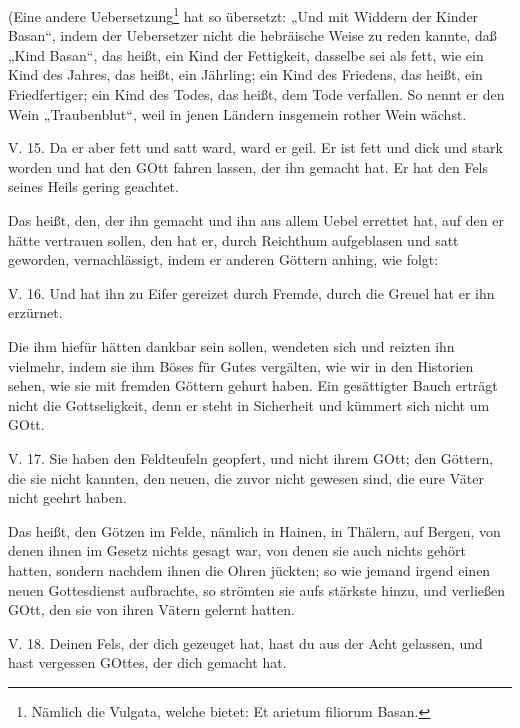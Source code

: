 (Eine andere Uebersetzung\footnote{Nämlich die Vulgata, welche bietet: Et arietum filiorum Basan.} hat so übersetzt: „Und mit Widdern der Kinder Basan“, indem der Uebersetzer nicht die hebräische Weise zu reden kannte, daß „Kind Basan“, das heißt, ein Kind der Fettigkeit, dasselbe sei als fett, wie ein Kind des Jahres, das heißt, ein Jährling; ein Kind des Friedens, das heißt, ein Friedfertiger; ein Kind des Todes, das heißt, dem Tode verfallen. So nennt er den Wein „Traubenblut“, weil in jenen Ländern insgemein rother Wein wächst.

\begin{schriftzitat}
V. 15. Da er aber fett und satt ward, ward er geil. Er ist fett und dick und stark worden und hat den GOtt fahren lassen, der ihn gemacht hat. Er hat den Fels seines Heils gering geachtet.
\end{schriftzitat}

Das heißt, den, der ihn gemacht und ihn aus allem Uebel errettet hat, auf den er hätte vertrauen sollen, den hat er, durch Reichthum aufgeblasen und satt geworden, vernachlässigt, indem er anderen Göttern anhing, wie folgt:

\begin{schriftzitat}
V. 16. Und hat ihn zu Eifer gereizet durch Fremde, durch die Greuel hat er ihn erzürnet.
\end{schriftzitat}

Die ihm hiefür hätten dankbar sein sollen, wendeten sich und reizten ihn vielmehr, indem
sie ihm Böses für Gutes vergälten, wie wir in den Historien sehen, wie sie mit fremden Göttern gehurt haben. Ein gesättigter Bauch erträgt nicht die Gottseligkeit, denn er steht in Sicherheit und kümmert sich nicht um GOtt.

\begin{schriftzitat}
V. 17. Sie haben den Feldteufeln geopfert, und nicht ihrem GOtt; den Göttern, die sie nicht kannten, den neuen, die zuvor nicht gewesen sind, die eure Väter nicht geehrt haben.
\end{schriftzitat}

Das heißt, den Götzen im Felde, nämlich in Hainen, in Thälern, auf Bergen, von denen ihnen im Gesetz nichts gesagt war, von denen sie auch nichts gehört hatten, sondern nachdem ihnen die Ohren jückten; so wie jemand irgend einen neuen Gottesdienst aufbrachte, so strömten sie aufs stärkste hinzu, und verließen GOtt, den sie von ihren Vätern gelernt hatten.

\begin{schriftzitat}
V. 18. Deinen Fels, der dich gezeuget hat, hast du aus der Acht gelassen, und hast vergessen GOttes, der dich gemacht hat.
\end{schriftzitat}

